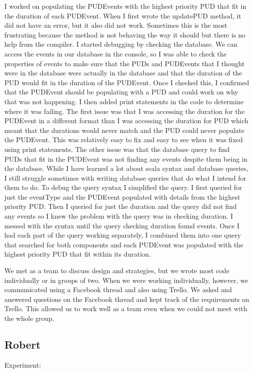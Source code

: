 \documentclass{article}
\begin{document}
I worked on populating the PUDEvents with the highest priority PUD that fit in the duration of each PUDEvent.  When I first wrote the updatePUD method, it did not have an error, but it also did not work.  Sometimes this is the most frustrating because the method is not behaving the way it should but there is no help from the compiler.  I started debugging by checking the database.  We can access the events in our database in the console, so I was able to check the properties of events to make sure that the PUDs and PUDEvents that I thought were in the database were actually in the database and that the duration of the PUD would fit in the duration of the PUDEvent.  Once I checked this, I confirmed that the PUDEvent should be populating with a PUD and could work on why that was not happening.  I then added print statements in the code to determine where it was failing.  The first issue was that I was accessing the duration for the PUDEvent in a different format than I was accessing the duration for PUD which meant that the durations would never match and the PUD could never populate the PUDEvent.  This was relatively easy to fix and easy to see when it was fixed using print statements.  The other issue was that the database query to find PUDs that fit in the PUDEvent was not finding any events despite them being in the database.  While I have learned a lot about scala syntax and database queries, I still struggle sometimes with writing database queries that do what I intend for them to do.  To debug the query syntax I simplified the query. I first queried for just the eventType and the PUDEvent populated with details from the highest priority PUD.  Then I queried for just the duration and the query did not find any events so I knew the problem with the query was in checking duration.  I messed with the syntax until the query checking duration found events.  Once I had each part of the query working separately, I combined them into one query that searched for both components and each PUDEvent was populated with the highest priority PUD that fit within its duration.  

We met as a team to discuss design and strategies, but we wrote most code individually or in groups of two.  When we were working individually, however, we communicated using a Facebook thread and also using Trello.  We asked and answered questions on the Facebook thread and kept track of the requirements on Trello.  This allowed us to work well as a team even when we could not meet with the whole group.


\subsection{Robert}
Experiment:
\end{document}
